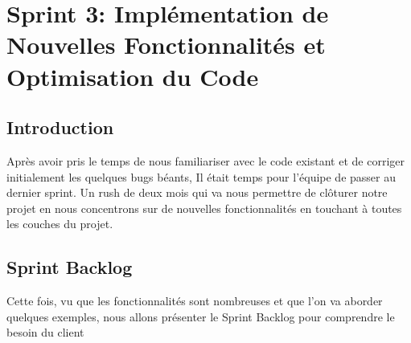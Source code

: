 \documentclass[../main.tex]{subfiles}
\begin{document}
\chapter{Sprint 3: Implémentation de Nouvelles Fonctionnalités et Optimisation du Code}
\section{Introduction}
Après avoir pris le temps de nous familiariser avec le code existant et de corriger initialement les quelques bugs béants, Il était temps pour l'équipe de passer au dernier sprint. Un rush de deux mois qui va nous permettre de clôturer notre projet en nous concentrons sur de nouvelles fonctionnalités en touchant à toutes les couches du projet. 
 \section{Sprint Backlog}
Cette fois, vu que les fonctionnalités sont nombreuses et que l'on va aborder quelques exemples, nous allons présenter le Sprint Backlog pour comprendre le besoin du client 
\newpage
\end{document}
